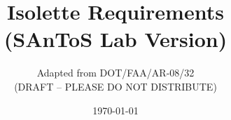 \documentclass{book}
\begin{document}

\title{Isolette Requirements \\
{\large (SAnToS Lab Version)}}

\author{
Adapted from DOT/FAA/AR-08/32\\
(DRAFT -- PLEASE DO NOT DISTRIBUTE)
}

\date{{\small \today}}

\maketitle

\tableofcontents

\pagestyle{plain}






\end{document}

